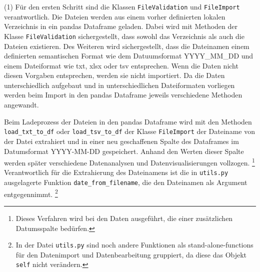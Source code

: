     
    (1) Für den ersten Schritt sind die Klassen \texttt{FileValidation} und \texttt{FileImport} verantwortlich.
    Die Dateien werden aus einem vorher definierten lokalen Verzeichnis in ein pandas Dataframe geladen. 
    Dabei wird mit Methoden der Klasse \texttt{FileValidation} sichergestellt, dass sowohl das Verzeichnis als auch die Dateien existieren. 
    Des Weiteren wird sichergestellt, dass die Dateinamen einem definierten semantischen Format wie dem Datuumsformat YYYY\_MM\_DD und 
    einem Dateiformat wie txt, xlsx oder tsv entsprechen. Wenn die Daten nicht diesen Vorgaben entsprechen, werden sie nicht
    importiert. Da die Daten unterschiedlich aufgebaut und in unterschiedlichen Dateiformaten vorliegen 
    werden beim Import in den pandas Dataframe jeweils verschiedene Methoden angewandt.
    
    Beim Ladeprozess der Dateien in den pandas Dataframe wird mit den Methoden \texttt{load\_txt\_to\_df} oder \texttt{load\_tsv\_to\_df} der Klasse \texttt{FileImport} 
    der Dateiname von der Datei extrahiert und in einer neu geschaffenen Spalte des Dataframes im Datumsformat YYYY-MM-DD gespeichert.
    Anhand den Werten dieser Spalte werden später verschiedene Datenanalysen und Datenvisualisierungen vollzogen. \footnote{Dieses Verfahren wird bei den Daten ausgeführt, die einer zusätzlichen Datumsspalte bedürfen.} 
    Verantwortlich für die Extrahierung des Dateinamens ist die in \texttt{utils.py} ausgelagerte Funktion \texttt{date\_from\_filename},
    die den Dateinamen als Argument entgegennimmt.
    \footnote{In der Datei \texttt{utils.py} sind noch andere Funktionen als stand-alone-functions für den Datenimport und Datenbearbeitung gruppiert,
    da diese das Objekt \texttt{self} nicht verändern.} 
    
